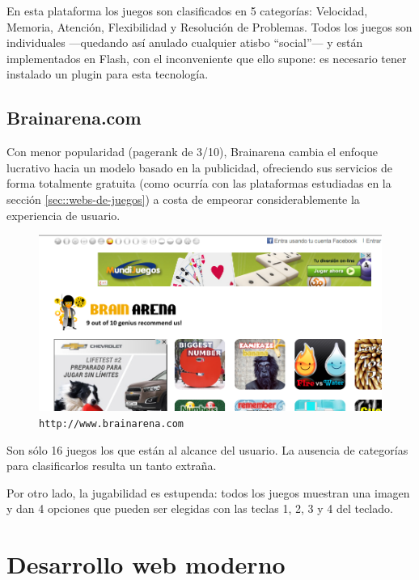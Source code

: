 En esta plataforma los juegos son clasificados en 5 categorías: Velocidad, Memoria, Atención, Flexibilidad y Resolución de Problemas. Todos los juegos son individuales ---quedando así anulado cualquier atisbo ``social''--- y están implementados en Flash, con el inconveniente que ello supone: es necesario tener instalado un plugin para esta tecnología.

\subsection*{Brainarena.com}

Con menor popularidad (pagerank de 3/10), Brainarena cambia el enfoque lucrativo hacia un modelo basado en la publicidad, ofreciendo sus servicios de forma totalmente gratuita (como ocurría con las plataformas estudiadas en la sección \ref{sec::webs-de-juegos}) a costa de empeorar considerablemente la experiencia de usuario.

\begin{figure}[h]
  \begin{center}
    \includegraphics[width=\textwidth]{images/brainarena.png}
    \caption{{\tt http://www.brainarena.com}}
    \label{fig::brainarena}
  \end{center}
\end{figure}


Son sólo 16 juegos los que están al alcance del usuario. La ausencia de categorías para clasificarlos resulta un tanto extraña.

Por otro lado, la jugabilidad es estupenda: todos los juegos muestran una imagen y dan 4 opciones que pueden ser elegidas con las teclas 1, 2, 3 y 4 del teclado.

\section{Desarrollo web moderno}
\label{sec::desarrollo-web}

